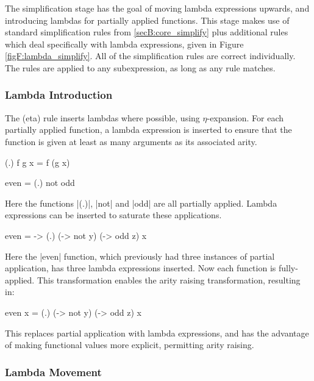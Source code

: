 The simplification stage has the goal of moving lambda expressions upwards, and introducing lambdas for partially applied functions. This stage makes use of standard simplification rules from \ref{secB:core_simplify} plus additional rules which deal specifically with lambda expressions, given in Figure \ref{figF:lambda_simplify}. All of the simplification rules are correct individually. The rules are applied to any subexpression, as long as any rule matches.

\subsubsection{Lambda Introduction}

The (eta) rule inserts lambdas where possible, using $\eta$-expansion. For each partially applied function, a lambda expression is inserted to ensure that the function is given at least as many arguments as its associated arity.

\begin{example}
\ignore\begin{code}
(.) f g x = f (g x)

even = (.) not odd
\end{code}

\noindent Here the functions |(.)|, |not| and |odd| are all partially applied. Lambda expressions can be inserted to saturate these applications.

\begin{code}
even = \x -> (.) (\y -> not y) (\z -> odd z) x
\end{code}

\noindent Here the |even| function, which previously had three instances of partial application, has three lambda expressions inserted. Now each function is fully-applied. This transformation enables the arity raising transformation, resulting in:

\begin{code}
even x = (.) (\y -> not y) (\z -> odd z) x
\end{code}
\end{example}

This replaces partial application with lambda expressions, and has the advantage of making functional values more explicit, permitting arity raising.

\subsubsection{Lambda Movement}
\label{secF:sharing}

